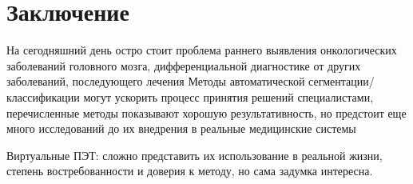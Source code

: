 \section*{Заключение} 





На сегодняшний день остро стоит проблема раннего выявления онкологических заболеваний 
головного мозга, дифференциальной диагностике от других заболеваний, последующего лечения
Методы автоматической сегментации/классификации могут ускорить процесс принятия 
решений специалистами, перечисленные методы показывают хорошую результативность, но предстоит еще 
много исследований до их внедрения в реальные медицинские системы \par


Виртуальные ПЭТ: сложно представить
их использование в реальной жизни, степень востребованности и доверия к
методу, но сама задумка интересна.



